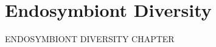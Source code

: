 % 
\graphicspath{{chapters/3.Chapter_1/figures}}

\chapter{Endosymbiont Diversity}


ENDOSYMBIONT DIVERSITY CHAPTER
